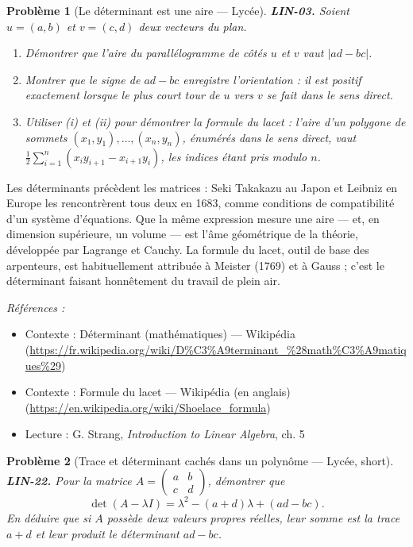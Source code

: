 \documentclass[11pt]{article}
\newtheorem{problem}{Problème}
\newenvironment{refs}{\par\small\noindent\emph{Références :}\begin{itemize}\setlength\itemsep{0pt}}{\end{itemize}\normalsize}
\begin{document}
\begin{problem}[{Le déterminant est une aire --- Lycée}]
\textbf{LIN-03.} Soient $u = (a, b)$ et $v = (c, d)$ deux vecteurs du
plan.
\begin{enumerate}
\item[(i)] Démontrer que l'aire du parallélogramme de côtés $u$ et $v$ vaut
$|ad - bc|$.
\item[(ii)] Montrer que le signe de $ad - bc$ enregistre l'orientation : il est positif
exactement lorsque le plus court tour de $u$ vers $v$ se fait dans le sens direct.
\item[(iii)] Utiliser (i) et (ii)
pour démontrer la \og{} formule du lacet \fg{} : l'aire d'un polygone de sommets
$(x_1, y_1), \dots, (x_n, y_n)$, énumérés dans le sens direct, vaut
$\frac{1}{2} \sum_{i=1}^{n} (x_i y_{i+1} - x_{i+1} y_i)$, les indices étant pris modulo $n$.
\end{enumerate}

\end{problem}

\noindent Les déterminants précèdent les matrices : Seki Takakazu au Japon et Leibniz en
Europe les rencontrèrent tous deux en 1683, comme conditions de compatibilité d'un système
d'équations. Que la même expression mesure une aire --- et, en dimension supérieure, un volume --- est
l'âme géométrique de la théorie, développée par Lagrange et Cauchy. La formule du lacet, outil de
base des arpenteurs, est habituellement attribuée à Meister (1769) et à Gauss ; c'est le déterminant
faisant honnêtement du travail de plein air.

\begin{refs}
\item Contexte : Déterminant (mathématiques) --- Wikipédia (\url{https://fr.wikipedia.org/wiki/D%C3%A9terminant_%28math%C3%A9matiques%29})
\item Contexte : Formule du lacet --- Wikipédia (en anglais) (\url{https://en.wikipedia.org/wiki/Shoelace_formula})
\item Lecture : G. Strang, \textit{Introduction to Linear Algebra}, ch. 5
\end{refs}

\bigskip

\begin{problem}[{Trace et déterminant cachés dans un polynôme --- Lycée, short}]
\textbf{LIN-22.} Pour la matrice
$A = \begin{pmatrix} a & b \\ c & d \end{pmatrix}$, démontrer que
\[ \det(A - \lambda I) = \lambda^2 - (a + d)\lambda + (ad - bc). \]
En déduire que si $A$ possède deux valeurs propres réelles, leur somme est la trace $a + d$ et
leur produit le déterminant $ad - bc$.
\end{problem}
\end{document}
